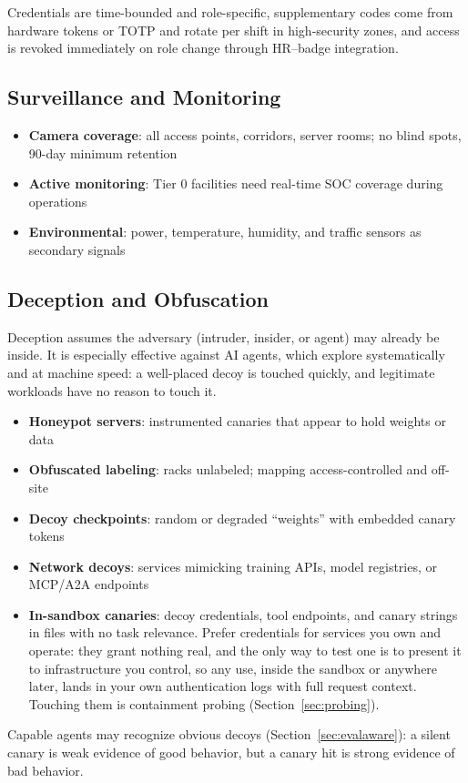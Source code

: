 \documentclass[11pt,letterpaper]{article}
\begin{document}
Credentials are time-bounded and role-specific, supplementary codes come from hardware tokens or TOTP and rotate per shift in high-security zones, and access is revoked immediately on role change through HR--badge integration.

\subsection{Surveillance and Monitoring}

\begin{itemize}
  \item \textbf{Camera coverage}: all access points, corridors, server rooms; no blind spots, 90-day minimum retention
  \item \textbf{Active monitoring}: Tier 0 facilities need real-time SOC coverage during operations
  \item \textbf{Environmental}: power, temperature, humidity, and traffic sensors as secondary signals
\end{itemize}

\subsection{Deception and Obfuscation}
\label{sec:deception}

Deception assumes the adversary (intruder, insider, or agent) may already be inside. It is especially effective against AI agents, which explore systematically and at machine speed: a well-placed decoy is touched quickly, and legitimate workloads have no reason to touch it.

\begin{securitybox}
\begin{itemize}
  \item \textbf{Honeypot servers}: instrumented canaries that appear to hold weights or data
  \item \textbf{Obfuscated labeling}: racks unlabeled; mapping access-controlled and off-site
  \item \textbf{Decoy checkpoints}: random or degraded ``weights'' with embedded canary tokens
  \item \textbf{Network decoys}: services mimicking training APIs, model registries, or MCP/A2A endpoints
  \item \textbf{In-sandbox canaries}: decoy credentials, tool endpoints, and canary strings in files with no task relevance. Prefer credentials for services you own and operate: they grant nothing real, and the only way to test one is to present it to infrastructure you control, so any use, inside the sandbox or anywhere later, lands in your own authentication logs with full request context. Touching them is containment probing (Section~\ref{sec:probing}).
\end{itemize}
Capable agents may recognize obvious decoys (Section~\ref{sec:evalaware}): a silent canary is weak evidence of good behavior, but a canary hit is strong evidence of bad behavior.
\end{securitybox}
\end{document}
